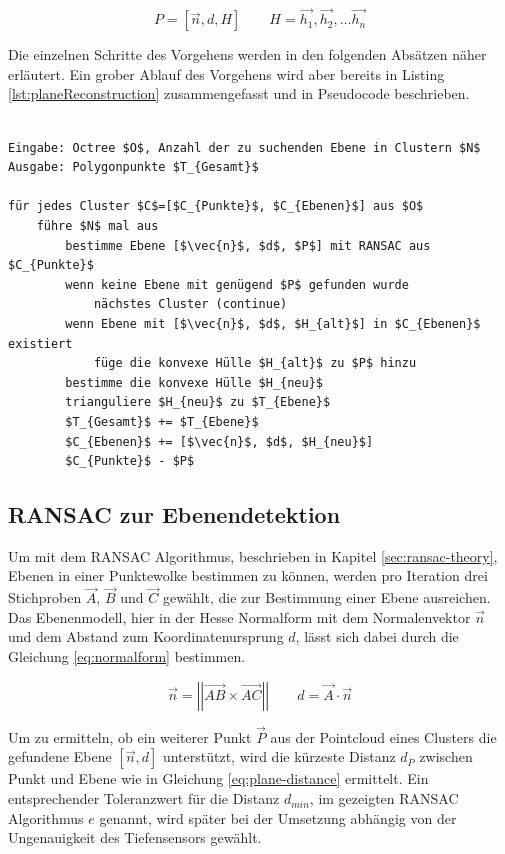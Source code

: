 \begin{equation} \label{eq:plane}
P=\left[\vec{n}, d, H\right] \qquad H=\vec{h_1}, \vec{h_2}, \ldots  \vec{h_n}
\end{equation}

Die einzelnen Schritte des Vorgehens werden in den folgenden Absätzen näher erläutert. Ein grober Ablauf des Vorgehens wird aber bereits in Listing \ref{lst:planeReconstruction} zusammengefasst und in Pseudocode beschrieben. 

\begin{lstlisting}[mathescape,caption=Planare Echtzeitrekonstruktion, label=lst:planeReconstruction, float=htbp]

Eingabe: Octree $O$, Anzahl der zu suchenden Ebene in Clustern $N$
Ausgabe: Polygonpunkte $T_{Gesamt}$

für jedes Cluster $C$=[$C_{Punkte}$, $C_{Ebenen}$] aus $O$
    führe $N$ mal aus
        bestimme Ebene [$\vec{n}$, $d$, $P$] mit RANSAC aus $C_{Punkte}$
        wenn keine Ebene mit genügend $P$ gefunden wurde
            nächstes Cluster (continue)
        wenn Ebene mit [$\vec{n}$, $d$, $H_{alt}$] in $C_{Ebenen}$ existiert	
            füge die konvexe Hülle $H_{alt}$ zu $P$ hinzu	
        bestimme die konvexe Hülle $H_{neu}$
        trianguliere $H_{neu}$ zu $T_{Ebene}$
        $T_{Gesamt}$ += $T_{Ebene}$
        $C_{Ebenen}$ += [$\vec{n}$, $d$, $H_{neu}$]
        $C_{Punkte}$ - $P$
\end{lstlisting}


\subsection{RANSAC zur Ebenendetektion} \label{sec:ransac}

Um mit dem RANSAC Algorithmus, beschrieben in Kapitel \ref{sec:ransac-theory}, Ebenen in einer Punktewolke bestimmen zu können, werden pro Iteration drei Stichproben \(\vec{A}\), \(\vec{B}\) und \(\vec{C}\) gewählt, die zur Bestimmung einer Ebene ausreichen. Das Ebenenmodell, hier in der Hesse Normalform mit dem Normalenvektor \(\vec{n}\) und dem Abstand zum Koordinatenursprung \(d\), lässt sich dabei durch die Gleichung \ref{eq:normalform} bestimmen.

\begin{equation}\label{eq:normalform}
\vec{n} =\left|\left| \vec{AB} \times \vec{AC}\right|\right|
\qquad
d = \vec{A} \cdot \vec{n}
\end{equation}

Um zu ermitteln, ob ein weiterer Punkt \(\vec{P}\) aus der Pointcloud eines Clusters die gefundene Ebene \(\left[\vec{n}, d\right]\) unterstützt, wird die kürzeste Distanz \(d_P\) zwischen Punkt und Ebene wie in Gleichung \ref{eq:plane-distance} ermittelt.  Ein entsprechender Toleranzwert für die Distanz \(d_{min}\), im gezeigten RANSAC Algorithmus \(e\) genannt, wird später bei der Umsetzung abhängig von der Ungenauigkeit des Tiefensensors gewählt. 

